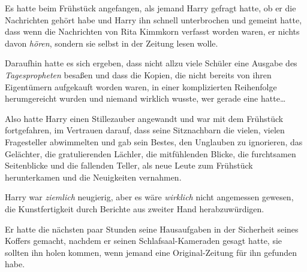 Es hatte beim Frühstück angefangen, als jemand Harry gefragt hatte, ob er die Nachrichten gehört habe und Harry ihn schnell unterbrochen und gemeint hatte, dass wenn die Nachrichten von Rita Kimmkorn verfasst worden waren, er nichts davon \emph{hören}, sondern sie selbst in der Zeitung lesen wolle.

Daraufhin hatte es sich ergeben, dass nicht allzu viele Schüler eine Ausgabe des \emph{Tagespropheten} besaßen und dass die Kopien, die nicht bereits von ihren Eigentümern aufgekauft worden waren, in einer komplizierten Reihenfolge herumgereicht wurden und niemand wirklich wusste, wer gerade eine hatte…

Also hatte Harry einen Stillezauber angewandt und war mit dem Frühstück fortgefahren, im Vertrauen darauf, dass seine Sitznachbarn die vielen, vielen Fragesteller abwimmelten und gab sein Bestes, den Unglauben zu ignorieren, das Gelächter, die gratulierenden Lächler, die mitfühlenden Blicke, die furchtsamen Seitenblicke und die fallenden Teller, als neue Leute zum Frühstück herunterkamen und die Neuigkeiten vernahmen.

Harry war \emph{ziemlich} neugierig, aber es wäre \emph{wirklich} nicht angemessen gewesen, die Kunstfertigkeit durch Berichte aus zweiter Hand herabzuwürdigen.

Er hatte die nächsten paar Stunden seine Hausaufgaben in der Sicherheit seines Koffers gemacht, nachdem er seinen Schlafsaal-Kameraden gesagt hatte, sie sollten ihn holen kommen, wenn jemand eine Original-Zeitung für ihn gefunden habe.


